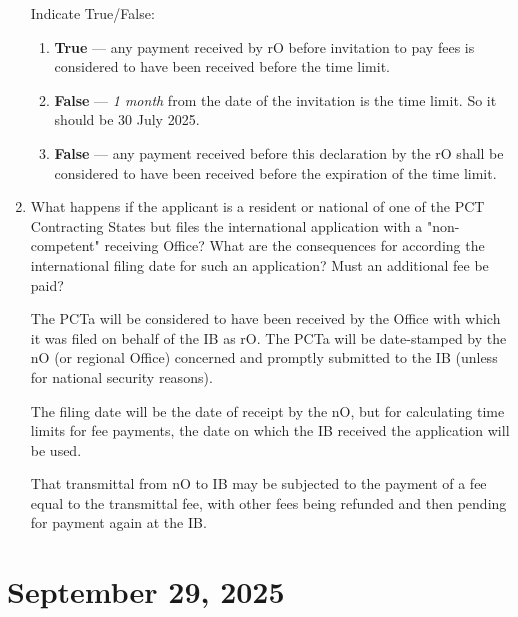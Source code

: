 \documentclass{report}
\begin{document}
\begin{enumerate}[label=\textbf{Answer \arabic*}]
                                                                                          
    Indicate True/False:
    \begin{enumerate}[label=(\alph*)]
        \item \textbf{True} --- any payment received by rO before invitation to pay fees is considered to have been received before the time limit.
        \item \textbf{False} --- \textit{1 month} from the date of the invitation is the time limit. So it should be 30 July 2025.
        \item \textbf{False} --- any payment received before this declaration by the rO shall be considered to have been received before the expiration of the time limit. 
    \end{enumerate}

    \item %
    What happens if the applicant is a resident or national of one of the PCT Contracting States but files the international application with a "non-competent" receiving Office? What are the consequences for according the international filing date for such an application? Must an additional fee be paid?
    
    The PCTa will be considered to have been received by the Office with which it was filed on behalf of the IB as rO. The PCTa will be date-stamped by the nO (or regional Office) concerned and promptly submitted to the IB (unless for national security reasons).
    
    The filing date will be the date of receipt by the nO, but for calculating time limits for fee payments, the date on which the IB received the application will be used.
    
    That transmittal from nO to IB may be subjected to the payment of a fee equal to the transmittal fee, with other fees being refunded and then pending for payment again at the IB. 

\end{enumerate}

\section{September 29, 2025}
\end{document}
